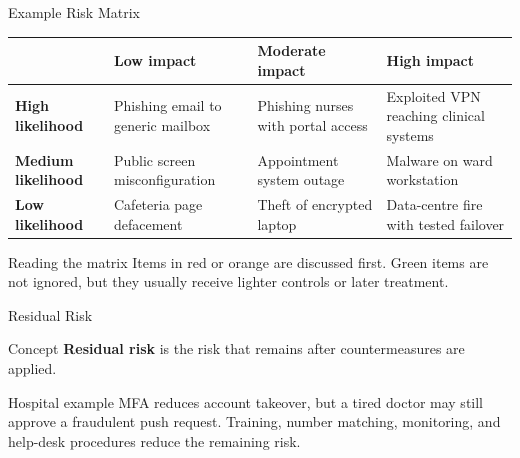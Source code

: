\documentclass[presentation]{beamer}
\begin{document}
\begin{frame}[c]{Example Risk Matrix}
\begin{center}
\scriptsize
\renewcommand{\arraystretch}{1.35}
\begin{tabular}{>{\bfseries}p{} p{} p{} p{}}
\toprule
 & \textbf{Low impact} & \textbf{Moderate impact} & \textbf{High impact} \\
\midrule
\textbf{High likelihood}
& \cellcolor{yellow!35} Phishing email to generic mailbox
& \cellcolor{orange!35} Phishing nurses with portal access
& \cellcolor{red!35} Exploited VPN reaching clinical systems \\
\textbf{Medium likelihood}
& \cellcolor{green!25} Public screen misconfiguration
& \cellcolor{yellow!35} Appointment system outage
& \cellcolor{orange!35} Malware on ward workstation \\
\textbf{Low likelihood}
& \cellcolor{green!15} Cafeteria page defacement
& \cellcolor{green!25} Theft of encrypted laptop
& \cellcolor{yellow!35} Data-centre fire with tested failover \\
\bottomrule
\end{tabular}
\end{center}

\begin{block}{Reading the matrix}
Items in red or orange are discussed first. Green items are not ignored, but they usually receive
lighter controls or later treatment.
\end{block}
\end{frame}

\begin{frame}[c]{Residual Risk}
\begin{block}{Concept}
\textbf{Residual risk} is the risk that remains after countermeasures are applied.
\end{block}

\begin{exampleblock}{Hospital example}
MFA reduces account takeover, but a tired doctor may still approve a fraudulent push request.
Training, number matching, monitoring, and help-desk procedures reduce the remaining risk.
\end{exampleblock}
\end{frame}
\end{document}
